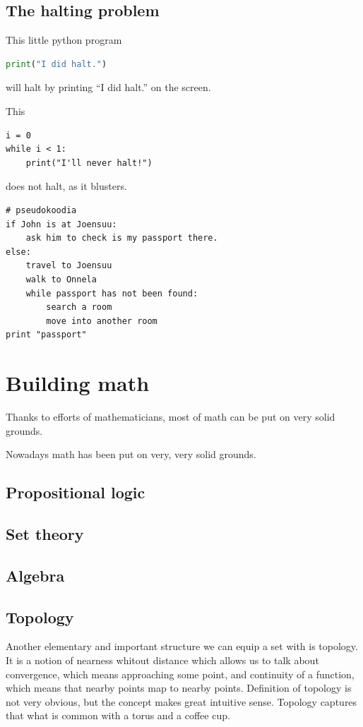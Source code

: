 \documentclass[11pt,oneside,%
]{memoir}
\begin{document}

\section{The halting problem}

This little python program
\begin{lstlisting}[language=python]
print("I did halt.")
\end{lstlisting}
will halt by printing ``I did halt.'' on the screen.

This
\begin{lstlisting}
i = 0
while i < 1:
    print("I'll never halt!")
\end{lstlisting}
does not halt, as it blusters.

\begin{lstlisting}
# pseudokoodia
if John is at Joensuu:
    ask him to check is my passport there.
else:
    travel to Joensuu
    walk to Onnela
    while passport has not been found:
        search a room
        move into another room
print "passport"
\end{lstlisting}
\chapter{Building math}

Thanks to efforts of mathematicians, most of math can be put on very solid grounds.

Nowadays math has been put on very, very solid grounds.

\section{Propositional logic}

\section{Set theory}

\section{Algebra}

\section{Topology}

Another elementary and important structure we can equip a set with is topology. It is a notion of nearness whitout distance which allows us to talk about convergence, which means approaching some point, and continuity of a function, which means that nearby points map to nearby points. Definition of topology is not very obvious, but the concept makes great intuitive sense. Topology captures that what is common with a torus and a coffee cup.
\end{document}
